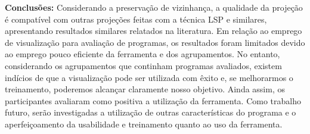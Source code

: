 \begin{resumo}
\textbf{Conclusões:} 
Considerando a preservação de vizinhança, a qualidade da projeção é compatível
com outras projeções feitas com a técnica LSP e similares, apresentando resultados
similares relatados na literatura. Em relação ao emprego de visualização para
avaliação de programas, os resultados foram limitados devido ao emprego pouco
eficiente da ferramenta e dos agrupamentos. No entanto, considerando os agrupamentos
que continham programas avaliados, existem indícios de que a visualização pode
ser utilizada com êxito e, se melhorarmos o treinamento, poderemos alcançar
claramente nosso objetivo. Ainda assim, os participantes avaliaram como positiva
a utilização da ferramenta. Como trabalho futuro, serão investigadas a utilização
de outras características do programa e o aperfeiçoamento da usabilidade e
treinamento quanto ao uso da ferramenta.

\vspace{.3cm}
\end{resumo}



